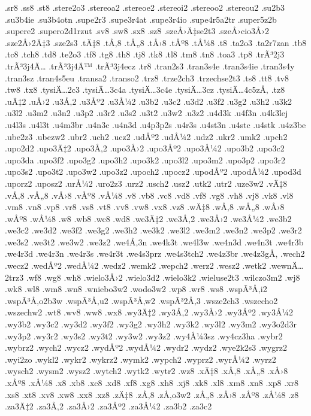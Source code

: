 {.sr8
.ss8
.st8
.stere2o3
.stereoa2
.stereoe2
.stereoi2
.stereoo2
.stereou2
.su2b3
.su3b4ie
.su3b4otn
.supe2r3
.supe3r4at
.supe3r4io
.supe4r5a2tr
.super5z2b
.supere2
.supero2d1rzut
.sv8
.sw8
.sx8
.sz8
.szeÅ›Ä‡se2t3
.szeÅ›cio3Å›2
.sze2Å›2Ä‡3
.sze2s3
.tÄ‡8
.tÅ‚8
.tÅ„8
.tÅ›8
.tÅº8
.tÅ¼8
.t8
.ta2o3
.ta2r7zan
.tb8
.tc8
.tch8
.td8
.te2o3
.tf8
.tg8
.th8
.tj8
.tk8
.tl8
.tm8
.tn8
.toa3
.tp8
.trÃ³2j3
.trÃ³3j4Ä…
.trÃ³3j4Ä™
.trÃ³3j4ecz
.tr8
.tran2s3
.tran3s4e
.tran3s4ie
.tran3s4y
.tran3sz
.tran4s5eu
.transa2
.transo2
.trz8
.trze2ch3
.trzechse2t3
.ts8
.tt8
.tv8
.tw8
.tx8
.tysiÄ…2c3
.tysiÄ…3c4a
.tysiÄ…3c4e
.tysiÄ…3cz
.tysiÄ…4c5zÅ‚
.tz8
.uÄ‡2
.uÅ›2
.u3Å‚2
.u3Åº2
.u3Å¼2
.u3b2
.u3c2
.u3d2
.u3f2
.u3g2
.u3h2
.u3k2
.u3l2
.u3m2
.u3n2
.u3p2
.u3r2
.u3s2
.u3t2
.u3w2
.u3z2
.u4d3k
.u4f3n
.u4k3lej
.u4l3s
.u4l3t
.u4m3br
.u4n3c
.u4n3d
.u4p3p2s
.u4r3s
.u4st3n
.u4stc
.u4stk
.u4z3be
.ube2z3
.ubezw2
.ubr2
.uch2
.ucz2
.udÅº2
.udÅ¼2
.udz2
.ukr2
.umk2
.upch2
.upo2d2
.upo3Ä‡2
.upo3Å‚2
.upo3Å›2
.upo3Åº2
.upo3Å¼2
.upo3b2
.upo3c2
.upo3da
.upo3f2
.upo3g2
.upo3h2
.upo3k2
.upo3l2
.upo3m2
.upo3p2
.upo3r2
.upo3s2
.upo3t2
.upo3w2
.upo3z2
.upoch2
.upocz2
.upodÅº2
.upodÅ¼2
.upod3d
.uporz2
.uposz2
.urÅ¼2
.uro2z3
.urz2
.usch2
.usz2
.utk2
.utr2
.uze3w2
.vÄ‡8
.vÅ‚8
.vÅ„8
.vÅ›8
.vÅº8
.vÅ¼8
.v8
.vb8
.vc8
.vd8
.vf8
.vg8
.vh8
.vj8
.vk8
.vl8
.vm8
.vn8
.vp8
.vr8
.vs8
.vt8
.vv8
.vw8
.vx8
.vz8
.wÄ‡8
.wÅ‚8
.wÅ„8
.wÅ›8
.wÅº8
.wÅ¼8
.w8
.wb8
.wc8
.wd8
.we3Ä‡2
.we3Å‚2
.we3Å›2
.we3Å¼2
.we3b2
.we3c2
.we3d2
.we3f2
.we3g2
.we3h2
.we3k2
.we3l2
.we3m2
.we3n2
.we3p2
.we3r2
.we3s2
.we3t2
.we3w2
.we3z2
.we4Å‚3n
.we4k3t
.we4l3w
.we4n3d
.we4n3t
.we4r3b
.we4r3d
.we4r3n
.we4r3s
.we4r3t
.we4s3prz
.we4s3tch2
.we4z3br
.we4z3gÅ‚
.wech2
.wecz2
.wedÅº2
.wedÅ¼2
.wedz2
.wemk2
.wepch2
.werz2
.wesz2
.wetk2
.wewnÄ…2trz3
.wf8
.wg8
.wh8
.wielo3Å›2
.wielo3d2
.wielo3k2
.wieluse2t3
.wilczo3m2
.wj8
.wk8
.wl8
.wm8
.wn8
.wniebo3w2
.wodo3w2
.wp8
.wr8
.ws8
.wspÃ³Å‚i2
.wspÃ³Å‚o2b3w
.wspÃ³Å‚u2
.wspÃ³Å‚w2
.wspÃ³2Å‚3
.wsze2ch3
.wszecho2
.wszechw2
.wt8
.wv8
.ww8
.wx8
.wy3Ä‡2
.wy3Å‚2
.wy3Å›2
.wy3Åº2
.wy3Å¼2
.wy3b2
.wy3c2
.wy3d2
.wy3f2
.wy3g2
.wy3h2
.wy3k2
.wy3l2
.wy3m2
.wy3o2d3r
.wy3p2
.wy3r2
.wy3s2
.wy3t2
.wy3w2
.wy3z2
.wy4Å¼3sz
.wy4cz3ha
.wybr2
.wybrz2
.wych2
.wycz2
.wydÅº2
.wydÅ¼2
.wydr2
.wydz2
.wye2k2s3
.wygrz2
.wyi2zo
.wykl2
.wykr2
.wykrz2
.wymk2
.wypch2
.wyprz2
.wyrÅ¼2
.wyrz2
.wysch2
.wysm2
.wysz2
.wytch2
.wytk2
.wytr2
.wz8
.xÄ‡8
.xÅ‚8
.xÅ„8
.xÅ›8
.xÅº8
.xÅ¼8
.x8
.xb8
.xc8
.xd8
.xf8
.xg8
.xh8
.xj8
.xk8
.xl8
.xm8
.xn8
.xp8
.xr8
.xs8
.xt8
.xv8
.xw8
.xx8
.xz8
.zÄ‡8
.zÅ‚8
.zÅ‚o3w2
.zÅ„8
.zÅ›8
.zÅº8
.zÅ¼8
.z8
.za3Ä‡2
.za3Å‚2
.za3Å›2
.za3Åº2
.za3Å¼2
.za3b2
.za3c2
}
